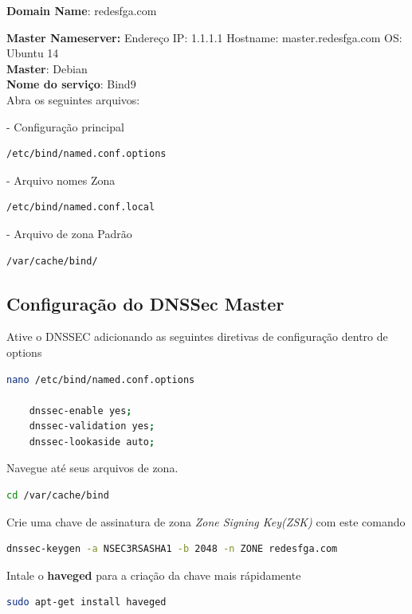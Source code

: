 \documentclass[12pt,openright,a4paper]{report}
\begin{document}
{\textbf{Domain Name}: redesfga.com

\textbf{Master Nameserver:} Endereço IP: 1.1.1.1 Hostname: master.redesfga.com OS: Ubuntu 14\\

\textbf{Master}: Debian\\

\textbf{Nome do serviço}: Bind9\\

Abra os seguintes arquivos:

- Configuração principal
\begin{lstlisting}[language=bash]
	/etc/bind/named.conf.options
\end{lstlisting}

- Arquivo nomes Zona
\begin{lstlisting}[language=bash]
	/etc/bind/named.conf.local
\end{lstlisting}

- Arquivo de zona Padrão
\begin{lstlisting}[language=bash]
	/var/cache/bind/	
\end{lstlisting}

\subsection{Configuração do DNSSec Master}
Ative o DNSSEC adicionando as seguintes diretivas de configuração dentro de options{ }
\begin{lstlisting}[language=bash]
	nano /etc/bind/named.conf.options
	
	dnssec-enable yes;
	dnssec-validation yes;
	dnssec-lookaside auto;
\end{lstlisting}

Navegue até seus arquivos de zona.
\begin{lstlisting}[language=bash]
	cd /var/cache/bind	
\end{lstlisting}

Crie uma chave de assinatura de zona \textit{Zone Signing Key(ZSK)} com este comando
\begin{lstlisting}[language=bash]
	dnssec-keygen -a NSEC3RSASHA1 -b 2048 -n ZONE redesfga.com
\end{lstlisting}

Intale o \textbf{haveged} para a criação da chave mais rápidamente
\begin{lstlisting}[language=bash]
	sudo apt-get install haveged
\end{lstlisting}

}
\end{document}
